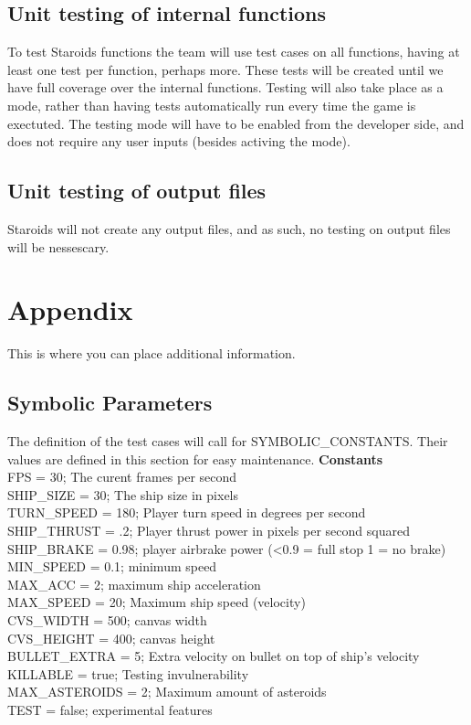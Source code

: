 \documentclass[12pt, titlepage]{article}
\begin{document}
\subsection{Unit testing of internal functions}
To test Staroids functions the team will use test cases on all functions, having at least one test per function, perhaps more. These tests will be created until we have full coverage over the internal functions. Testing will also take place as a mode, rather than having tests automatically run every time the game is exectuted. The testing mode will have to be enabled from the developer side, and does not require any user inputs (besides activing the mode).

\subsection{Unit testing of output files}
Staroids will not create any output files, and as such, no testing on output files will be nessescary.





\newpage

\section{Appendix}

This is where you can place additional information.

\subsection{Symbolic Parameters}

The definition of the test cases will call for SYMBOLIC\_CONSTANTS.
Their values are defined in this section for easy maintenance.
\textbf{Constants}\\
FPS = 30; The curent frames per second\\
SHIP\_SIZE = 30; The ship size in pixels\\
TURN\_SPEED = 180; Player turn speed in degrees per second\\
SHIP\_THRUST = .2; Player thrust power in pixels per second squared \\
SHIP\_BRAKE = 0.98; player airbrake power (<0.9 = full stop 1 = no brake) \\
MIN\_SPEED = 0.1; minimum speed \\
MAX\_ACC = 2; maximum ship acceleration \\
MAX\_SPEED = 20; Maximum ship speed (velocity) \\
CVS\_WIDTH = 500; canvas width \\
CVS\_HEIGHT = 400; canvas height \\
BULLET\_EXTRA = 5; Extra velocity on bullet on top of ship's velocity \\
KILLABLE = true; Testing invulnerability \\
MAX\_ASTEROIDS = 2; Maximum amount of asteroids \\
TEST = false; experimental features \\
\end{document}
